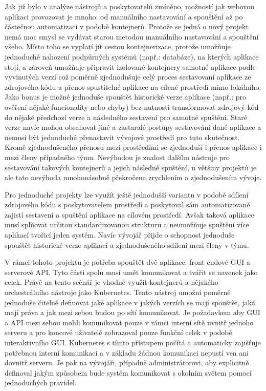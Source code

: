 \begin{itemize}
\begin{itemize}
			Jak již bylo v analýze nástrojů a poskytovatelů zmíněno, možností jak webovou aplikaci provozovat je mnoho: od
			manuálního nastavování a spouštění až po částečnou automatizaci v podobě kontejnerů.
			Protože se jedná o nový projekt nemá moc smysl se vydávat starou metodou manuálního nastavování a spouštění všeho.
			Místo toho se vyplatí jít cestou kontejnerizace, protože umožňuje jednoduché nahození podpůrných systémů
			(např.: databáze), na kterých aplikace stojí, a zároveň umožňuje připravit izolované kontejnery samotné aplikace
			podle vyvinutých verzí což poměrně zjednodušuje celý proces sestavovaní aplikace ze zdrojového kódu a přenos
			spustitelné aplikace na cílené prostředí mimo lokálního.
			Jako bonus je možné jednoduše spouštět historické verze aplikace (např.: pro ověření nějaké funcionality nebo chyby)
			bez nutnosti transformovat zdrojový kód do nějaké
			předchozí verze a následného sestavení pro samotné spuštění.
			Staré verze navíc mohou obsahovat jiné a zastaralé postupy sestavování dané aplikace a nemusí být jednoduché
			přenastavit vývojové prostředí pro tuto skutečnost.
			Kromě zjednodušeného přenosu mezi prostředími se zjednoduší i přenos aplikace i mezi členy případného týmu.
			Nevýhodou je znalost dalšího nástroje pro sestavování takových kontejnerů a jejich následné spuštění, u většiny
			projektů je ale tato nevýhoda mnohonásobně překročena zrychlením a zjednodušením vývoje.

			Pro jednoduché projekty lze využít ještě jednodušší variantu v podobě sdílení zdrojového kódu s poskytovatelem
			prostředí a poskytoval sám automatizovaně zajistí sestavení a spuštění aplikace na cílovém prostředí.
			Avšak taková aplikace musí splňovat určitou standardizovanou strukturu a neumožňuje spuštění více aplikací tvořicí
			jeden systém.
			Navíc vývojář přijde o schopnost jednoduše spouštět historické verze aplikací a zjednodušeného sdílení mezi členy
			v týmu.

			V rámci tohoto projektu je potřeba spouštět dvě aplikace: front-endové \ac{GUI} a serverové \ac{API}.
			Tyto části spolu musí umět komunikovat a tvářit se navenek jako celek.
			Právě na tento scénář je vhodné využít kontejnerů a nějakého orchestrálního nástroje jako Kubernetes.
			Tento nástroj umožní poměrně jednoduše čitelně definovat jaké aplikace v jakých verzích se mají spouštět, jaká mají
			práva a jak mezi sebou budou po sítí komunikovat.
			Je požadavkem aby \ac{GUI} a \ac{API} mezi sebou mohli komunikovat pouze v rámci interní sítě uvnitř jednoho serveru
			a pro koncové uživatelé zobrazoval pouze funkční celek v podobě interaktivního \ac{GUI}.
			Kubernetes s tímto přístupem počítá a automaticky zajišťuje potřebnou interní komunikaci a v základu žádnou komunikaci
			nepustí ven ani dovnitř serveru.
			Je pak na vývojáři, případně administrátorovi, aby explicitně definoval jakým způsobem bude systém komunikovat s
			okolním světem pomocí jednoduchých pravidel.


\end{itemize}
\end{itemize}
